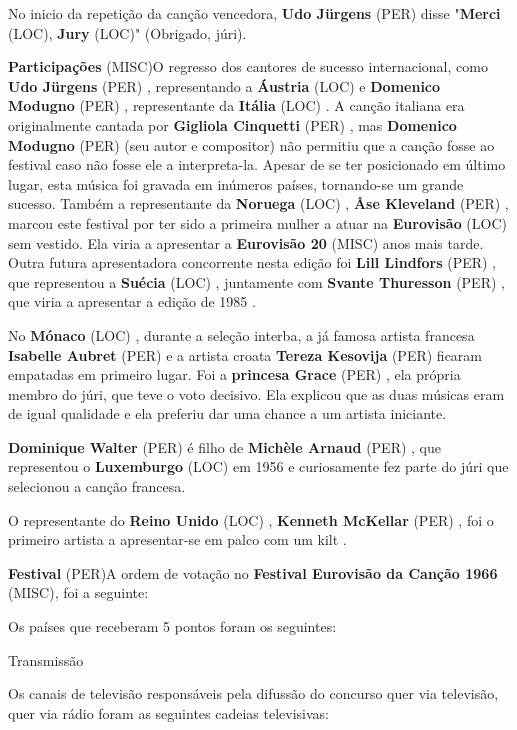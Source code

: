 \documentclass[12pt,a4paper]{article}
\begin{document}
No inicio da repetição da canção vencedora, \textbf{Udo Jürgens} (PER) disse "\textbf{Merci} (LOC), \textbf{Jury} (LOC)" (Obrigado, júri).



\textbf{Participações} (MISC)O regresso dos cantores de sucesso internacional, como \textbf{Udo Jürgens} (PER) , representando a \textbf{Áustria} (LOC) e \textbf{Domenico Modugno} (PER) , representante da \textbf{Itália} (LOC) . A canção italiana era originalmente cantada por \textbf{Gigliola Cinquetti} (PER) , mas \textbf{Domenico Modugno} (PER) (seu autor e compositor) não permitiu que a canção fosse ao festival caso não fosse ele a interpreta-la. Apesar de se ter posicionado em último lugar, esta música foi gravada em inúmeros países, tornando-se um grande sucesso. Também a representante da \textbf{Noruega} (LOC) , \textbf{Åse Kleveland} (PER) , marcou este festival por ter sido a primeira mulher a atuar na \textbf{Eurovisão} (LOC) sem vestido. Ela viria a apresentar a \textbf{Eurovisão 20} (MISC) anos mais tarde. Outra futura apresentadora concorrente nesta edição foi \textbf{Lill Lindfors} (PER) , que representou a \textbf{Suécia} (LOC) , juntamente com \textbf{Svante Thuresson} (PER) , que viria a apresentar a edição de 1985 .

No \textbf{Mónaco} (LOC) , durante a seleção interba, a já famosa artista francesa \textbf{Isabelle Aubret} (PER) e a artista croata \textbf{Tereza Kesovija} (PER) ficaram empatadas em primeiro lugar. Foi a \textbf{princesa Grace} (PER) , ela própria membro do júri, que teve o voto decisivo. Ela explicou que as duas músicas eram de igual qualidade e ela preferiu dar uma chance a um artista iniciante.

\textbf{Dominique Walter} (PER) é filho de \textbf{Michèle Arnaud} (PER) , que representou o \textbf{Luxemburgo} (LOC) em 1956 e curiosamente fez parte do júri que selecionou a canção francesa.

O representante do \textbf{Reino Unido} (LOC) , \textbf{Kenneth McKellar} (PER) , foi o primeiro artista a apresentar-se em palco com um kilt .



\textbf{Festival} (PER)A ordem de votação no \textbf{Festival Eurovisão da Canção 1966} (MISC), foi a seguinte:

Os países que receberam 5 pontos foram os seguintes:



Transmissão

Os canais de televisão responsáveis pela difussão do concurso quer via televisão, quer via rádio foram as seguintes cadeias televisivas:
\end{document}
